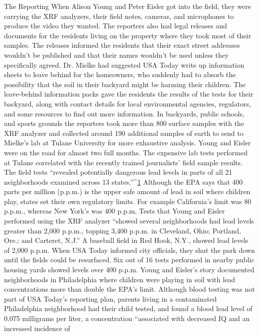The Reporting
When Alison Young and Peter Eisler got into the field, they were carrying the
XRF analyzers, their field notes, cameras, and microphones to produce the
video they wanted. The reporters also had legal releases and documents for
the residents living on the property where they took most of their samples.
The releases informed the residents that their exact street addresses wouldn't
be published and that their names wouldn't be used unless they specifically
agreed. Dr. Mielke had suggested USA Today write up information sheets
to leave behind for the homeowners, who suddenly had to absorb the possibility
that the soil in their backyard might be harming their children. The
leave-behind information packs gave the residents the results of the tests for
their backyard, along with contact details for local environmental agencies,
regulators, and some resources to find out more information.
In backyards, public schools, and sports grounds the reporters took more
than 800 surface samples with the XRF analyzer and collected around 190
additional samples of earth to send to Mielke's lab at Tulane University for
more exhaustive analysis. Young and Eisler were on the road for almost two
full months. The expensive lab tests performed at Tulane correlated with
the recently trained journalists' field sample results.
The field tests ``revealed potentially dangerous lead levels in parts of all 21
neighborhoods examined across 13 states.''^{\href{#endnotes-usa-today}{1}} Although the EPA says that 400
parts per million (p.p.m.) is the upper safe amount of lead in soil where children
play, states set their own regulatory limits. For example California's
limit was 80 p.p.m., whereas New York's was 400 p.p.m.
Tests that Young and Eisler performed using the XRF analyzer ``showed several
neighborhoods had lead levels greater than 2,000 p.p.m., topping 3,400
p.p.m. in Cleveland, Ohio; Portland, Ore.; and Carteret, N.J.'' A baseball field
in Red Hook, N.Y., showed lead levels of 2,000 p.p.m. When USA Today
informed city officials, they shut the park down until the fields could be
resurfaced. Six out of 16 tests performed in nearby public housing yards
showed levels over 400 p.p.m.
Young and Eisler's story documented neighborhoods in Philadelphia where
children were playing in soil with lead concentrations more than double the
EPA's limit. Although blood testing was not part of USA Today's reporting
plan, parents living in a contaminated Philadelphia neighborhood had their
child tested, and found a blood lead level of 0.075 milligrams per liter, a
concentration ``associated with decreased IQ and an increased incidence of

